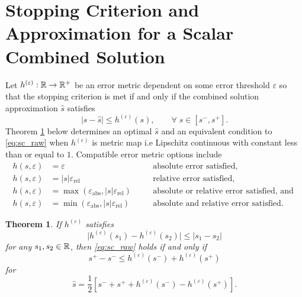 \documentclass{article}[12pt]
\newtheorem{theorem}{Theorem}[section]
\newcommand{\varepsabs}{\varepsilon_\text{abs}}
\newcommand{\varepsrel}{\varepsilon_\text{rel}}
\begin{document}
\section{Stopping Criterion and Approximation for a Scalar Combined Solution} \label{sec:opt_comb_sol_sc}

Let $h^{(\varepsilon)}: \mathbb{R} \to \mathbb{R}^+$ be an error metric dependent on some error threshold $\varepsilon$ so that the stopping criterion is met if and only if the combined solution approximation $\hat{s}$ satisfies 
\begin{equation}
    \lvert s-\hat{s} \rvert \leq h^{(\varepsilon)}(s), \qquad \forall\; s \in [s^-,s^+].
    \label{eq:sc_raw}
\end{equation}
Theorem \ref{thm:shat_opt} below determines an optimal $\hat{s}$ and an equivalent condition to \eqref{eq:sc_raw} when $h^{(\varepsilon)}$ is metric map i.e Lipschitz continuous with constant less than or equal to $1$. Compatible error metric options include
\begin{subequations}
\begin{align}
    h(s,\varepsilon) & = \varepsilon \quad &&\text{absolute error satisfied}, \label{eq:h_abs}\\
    h(s,\varepsilon) & = \lvert s \rvert \varepsrel \quad &&\text{relative error satisfied}, \label{eq:h_rel}\\
    h(s,\varepsilon) &= \max\left(\varepsabs,\lvert s \rvert \varepsrel \right) \quad &&\text{absolute or relative error satisfied, and } \label{eq:h_abs_or_rel} \\
    h(s,\varepsilon) &= \min\left(\varepsabs,\lvert s \rvert \varepsrel \right) \quad &&\text{absolute and relative error satisfied.} \label{eq:h_abs_and_rel}
\end{align}
\end{subequations}

\begin{theorem} \label{thm:shat_opt}
    If $h^{(\varepsilon)}$ satisfies
    $$\lvert h^{(\varepsilon)}(s_1) - h^{(\varepsilon)}(s_2) \rvert \leq \lvert s_1 - s_2 \rvert$$
    for any $s_1,s_2 \in \mathbb{R}$, then  \eqref{eq:sc_raw} holds if and only if 
    \begin{equation}
        s^+-s^- \leq h^{(\varepsilon)}(s^-)+h^{(\varepsilon)}(s^+)
        \label{eq:sc}
    \end{equation}
    for
    \begin{equation}
        \hat{s} = \frac{1}{2}\left[s^-+s^++h^{(\varepsilon)}(s^-)-h^{(\varepsilon)}(s^+)\right].
        \label{eq:shat_opt}
    \end{equation}
\end{theorem}
\end{document}
